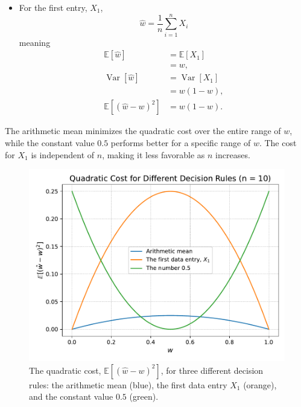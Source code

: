 \begin{example}
\begin{itemize}
		\item For the first entry, $X_1$,
		\begin{equation}
			\hat{w}=\frac{1}{n}\sum_{i=1}^nX_i
		\end{equation}
		meaning
		\begin{equation}
			\begin{split}
				\mathbb{E}[\hat{w}] & = \mathbb{E}[X_1]\\
				&=w,\\
				\operatorname{Var}[\hat{w}]	&= \operatorname{Var}[X_1]\\
				& = w(1-w),\\
				\mathbb{E}[(\hat{w}-w)^2]&=w(1-w).
			\end{split} 
		\end{equation}
	\end{itemize}
	The arithmetic mean minimizes the quadratic cost over the entire range of $w$, while the constant value $0.5$ performs better for a specific range of $w$. The cost for $X_1$ is independent of $n$, making it less favorable as $n$ increases.	
	\begin{figure}[H]
		\captionsetup{width=1\textwidth}
		\centering
		\includegraphics[width=1\textwidth]{figures/ber_example.pdf}
		\caption{The quadratic cost, $\mathbb{E}[(\hat{w} - w)^2]$, for three different decision rules: the arithmetic mean (blue), the first data entry $X_1$ (orange), and the constant value $0.5$ (green).}
		\label{fig:pen}
	\end{figure}
	
\end{example}

